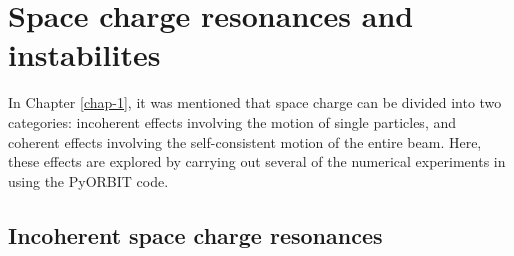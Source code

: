 \chapter{Space charge resonances and instabilites} \label{app-B}

In Chapter \ref{chap-1}, it was mentioned that space charge can be divided into two categories: incoherent effects involving the motion of single particles, and coherent effects involving the self-consistent motion of the entire beam. Here, these effects are explored by carrying out several of the numerical experiments in \cite{Hofmann2017Book} using the PyORBIT code. 


\section*{Incoherent space charge resonances}

